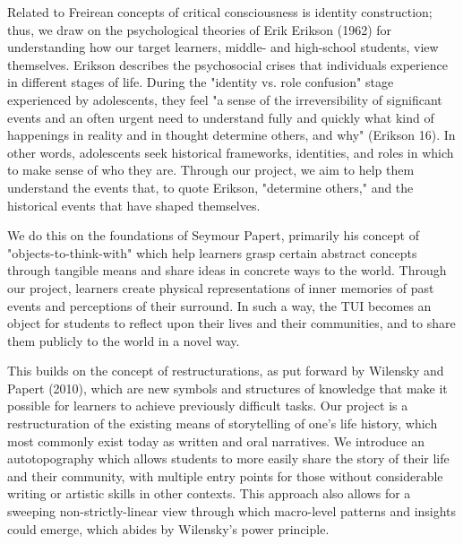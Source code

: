 \documentclass{sigchi-ext}
\begin{document}
Related to Freirean concepts of critical consciousness is identity construction; thus, we draw on the psychological theories of Erik Erikson (1962) for understanding how our target learners, middle- and high-school students, view themselves. Erikson describes the psychosocial crises that individuals experience in different stages of life. During the "identity vs. role confusion" stage experienced by adolescents, they feel "a sense of the irreversibility of significant events and an often urgent need to understand fully and quickly what kind of happenings in reality and in thought determine others, and why" (Erikson 16). In other words, adolescents seek historical frameworks, identities, and roles in which to make sense of who they are. Through our project, we aim to help them understand the events that, to quote Erikson, "determine others," and the historical events that have shaped themselves.

We do this on the foundations of Seymour Papert, primarily his concept of "objects-to-think-with" which help learners grasp certain abstract concepts through tangible means and share ideas in concrete ways to the world. Through our project, learners create physical representations of inner memories of past events and perceptions of their surround. In such a way, the TUI becomes an object for students to reflect upon their lives and their communities, and to share them publicly to the world in a novel way.

This builds on the concept of restructurations, as put forward by Wilensky and Papert (2010), which are new symbols and structures of knowledge that make it possible for learners to achieve previously difficult tasks. Our project is a restructuration of the existing means of storytelling of one's life history, which most commonly exist today as written and oral narratives. We introduce an autotopography which allows students to more easily share the story of their life and their community, with multiple entry points for those without considerable writing or artistic skills in other contexts. This approach also allows for a sweeping non-strictly-linear view through which macro-level patterns and insights could emerge, which abides by Wilensky's power principle.
\end{document}

